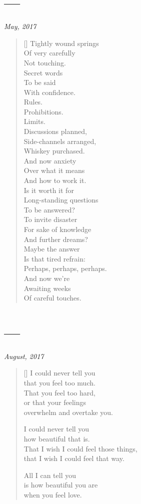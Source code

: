 \section{---}

\hfill\textit{May, 2017}

\begin{verse}[\textwidth]
  Tightly wound springs\\
  Of very carefully\\
  Not touching.\\
  \vin Secret words\\
  \vin To be said\\
  \vin With confidence.\\
  Rules.\\
  Prohibitions.\\
  Limits.\\
  \vin Discussions planned,\\
  \vin Side-channels arranged,\\
  \vin Whiskey purchased.\\
  And now anxiety\\
  Over what it means\\
  And how to work it.\\
  \vin Is it worth it for\\
  \vin Long-standing questions\\
  \vin To be answered?\\
  To invite disaster\\
  For sake of knowledge\\
  And further dreams?\\
  \vin Maybe the answer\\
  \vin Is that tired refrain:\\
  \vin Perhaps, perhaps, perhaps.\\
  And now we're\\
  Awaiting weeks\\
  Of careful touches.
\end{verse}
\newpage

\section{---}

\hfill\textit{August, 2017}

\begin{verse}[\textwidth]
I could never tell you\\
that you feel too much.\\
That you feel too hard,\\
or that your feelings\\
overwhelm and overtake you.

I could never tell you\\
how beautiful that is.\\
That I wish I could feel those things,\\
that I wish I could feel that way.

All I can tell you\\
is how beautiful you are\\
when you feel love.
\end{verse}
\newpage

